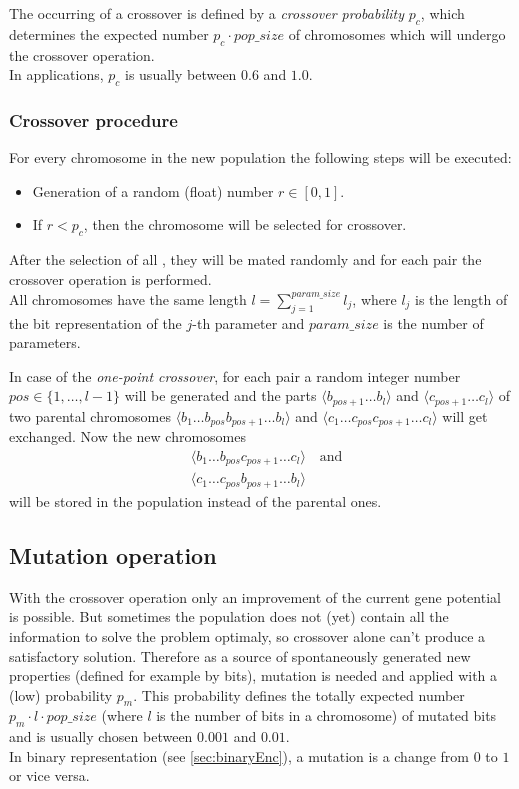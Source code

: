 The occurring of a crossover is defined by a \emph{crossover probability} $p_c$, which determines the expected number $p_c\cdot pop\_size$ of chromosomes which will undergo the crossover operation.\\
In applications, $p_c$ is usually between $0.6$ and $1.0$.

\subsubsection*{Crossover procedure}
For every chromosome in the new population the following steps will be executed:
\begin{itemize}
\item Generation of a random (float) number $r\in[0,1]$.
\item If $r<p_c$, then the chromosome will be selected for crossover.
\end{itemize}
After the selection of all , they will be mated randomly and for each pair the crossover operation is performed.\\
All chromosomes have the same length $l=\sum\limits_{j=1}^{param\_size} l_j$, where $l_j$ is the length of the bit representation of the $j$-th parameter and $param\_size$ is the number of parameters.

In case of the \emph{one-point crossover}, for each pair a random integer number $pos\in\{1,\ldots,l-1\}$ will be generated and the parts $\langle b_{pos+1}\ldots b_l \rangle$ and $\langle c_{pos+1}\ldots c_l \rangle$ of two parental chromosomes $\langle b_1\ldots b_{pos}b_{pos+1}\ldots b_l \rangle$ and $\langle c_1\ldots c_{pos}c_{pos+1}\ldots c_l \rangle$ will get exchanged. Now the new chromosomes
\begin{align*}
&\langle b_1\ldots b_{pos}c_{pos+1}\ldots c_l \rangle \quad \text{and} \\
&\langle c_1\ldots c_{pos}b_{pos+1}\ldots b_l \rangle
\end{align*}
will be stored in the population instead of the parental ones.


\subsection{Mutation operation}
With the crossover operation only an improvement of the current gene potential is possible. But sometimes the population does not (yet) contain all the information to solve the problem optimaly, so crossover alone can't produce a satisfactory solution. Therefore as a source of spontaneously generated new properties (defined for example by bits), mutation is needed and applied with a (low) probability $p_m$. This probability defines the totally expected number $p_m\cdot l\cdot pop\_size$ (where $l$ is the number of bits in a chromosome) of mutated bits and is usually chosen between $0.001$ and $0.01$.\\
In binary representation (see \ref{sec:binaryEnc}), a mutation is a change from $0$ to $1$ or vice versa.


